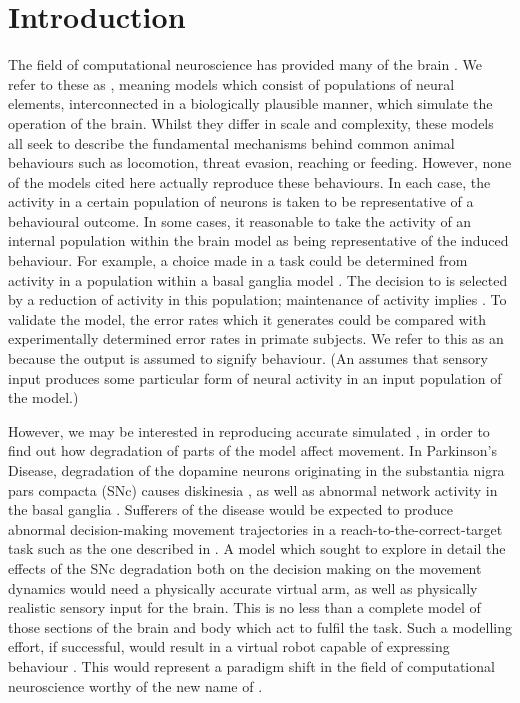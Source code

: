 \documentclass{frontiersSCNS}
\begin{document}
\section{Introduction} \label{sec:introduction}

The field of computational neuroscience has provided many  of the
brain \citep{arai_two-dimensional_1994,gancarz_neural_1998,hazy_towards_2007,blenkinsop_frequency_2017}.
We refer to these as , meaning
models which consist of populations of neural elements, interconnected
in a biologically plausible manner, which simulate the operation of
the brain. Whilst they differ in scale and complexity, these models
all seek to describe the fundamental mechanisms behind common animal
behaviours such as locomotion, threat evasion, reaching or
feeding. However, none of the models cited here actually reproduce
these behaviours. In each case, the activity in a certain population
of neurons is taken to be representative of a behavioural outcome.
In some cases, it  reasonable to take the activity of an
internal population within the brain model as being representative of
the induced behaviour. For example, a choice made in a 
task could be determined from activity in a population within a basal
ganglia model
\citep{nambu_discharge_1990,kuhn_event-related_2004}. The decision
to  is selected by a reduction of activity in this population;
maintenance of activity implies . To validate the model, the
error rates which it generates could be compared with experimentally
determined error rates in primate subjects. We refer to this as
an  because the output is assumed to
signify behaviour. (An  assumes that sensory
input produces some particular form of neural activity in an input
population of the model.)

However, we may be interested in reproducing accurate
simulated , in order to find out how degradation of
parts of the model affect movement. In Parkinson's Disease,
degradation of the dopamine neurons originating in the substantia
nigra pars compacta (SNc) causes
diskinesia \citep{galvan_pathophysiology_2008}, as well as abnormal
network activity in the basal
ganglia \citep{brown_dopamine_2001,mccarthy_striatal_2011}.  Sufferers
of the disease would be expected to produce abnormal
decision-making  movement trajectories in a
reach-to-the-correct-target task such as the one described in
\cite{james_target-distractor_2017}.
%
A model which sought to explore in detail the effects of the SNc
degradation both on the decision making  on the movement
dynamics would need a physically accurate virtual arm, as well as
physically realistic sensory input for the brain. This is no less than
a complete model of those sections of the brain and body which act to
fulfil the task. Such a modelling effort, if successful, would result
in a virtual robot capable of expressing behaviour . This would represent a paradigm
shift in the field of computational neuroscience worthy of the new
name of .
\end{document}
